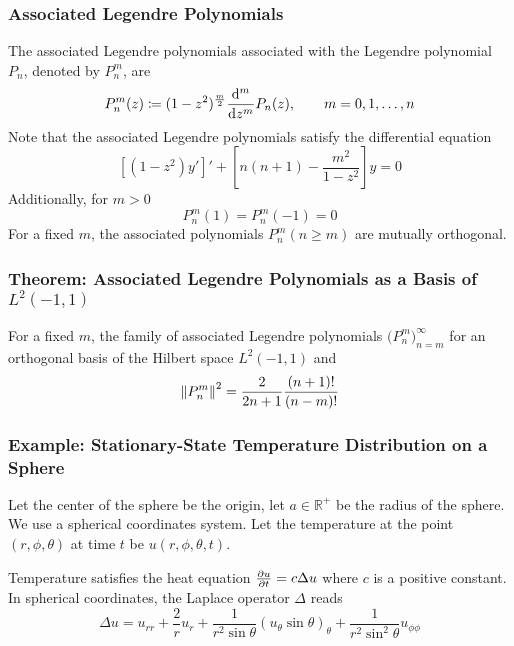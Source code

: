 \documentclass[11pt, a4paper]{article}
\newcommand{\R}{\mathbb{R}} %
\begin{document}
\subsubsection{Associated Legendre Polynomials}
The associated Legendre polynomials associated with the Legendre polynomial $ P_n $, denoted by $ P_{n}^{m} $, are
\begin{equation*}
	P_{n}^{m}(z) \coloneqq (1 - z^2)^{\frac{m}{2}}\dv[m]{}{z}P_n(z), \qquad m = 0, 1, \dots, n
\end{equation*}
Note that the associated Legendre polynomials satisfy the differential equation
\begin{equation*}
	\left[(1- z^2)y'\right]' + \left[n(n+1)-\frac{m^2}{1-z^2}\right]y = 0
\end{equation*}
Additionally, for $ m > 0 $
\begin{equation*}
	P_{n}^{m}(1) = P_{n}^{m}(-1) = 0
\end{equation*}
For a fixed $ m $, the associated polynomials $ P_{n}^{m}(n \geq m) $ are mutually orthogonal.

\subsubsection{Theorem: Associated Legendre Polynomials as a Basis of $ L^2(-1, 1) $}
For a fixed $ m $, the family of associated Legendre polynomials $ \big(P_{n}^{m}\big)_{n=m}^{\infty} $ for an orthogonal basis of the Hilbert space $ L^2(-1, 1)  $ and
\begin{equation*}
	\norm{P_{n}^{m}}^2 = \frac{2}{2n + 1}\frac{(n+1)!}{(n-m)!}
\end{equation*}

\subsubsection{Example: Stationary-State Temperature Distribution on a Sphere}
Let the center of the sphere be the origin, let $ a \in \R^+ $ be the radius of the sphere. We use a spherical coordinates system. Let the temperature at the point $ (r, \phi, \theta) $ at time $ t $ be $ u(r, \phi, \theta, t) $. 

Temperature satisfies the heat equation $ \pdv{u}{t} = c \Delta u $ where $ c $ is a positive constant. In spherical coordinates, the Laplace operator $ \Delta $ reads
\begin{equation*}
	\Delta u = u_{rr} + \frac{2}{r}u_r + \frac{1}{r^2\sin \theta}(u_{\theta}\sin \theta)_{\theta} + \frac{1}{r^2\sin^2\theta }u_{\phi \phi}
\end{equation*}
\end{document}

